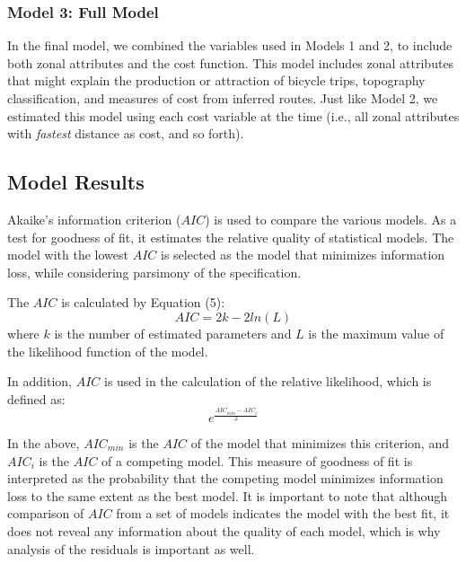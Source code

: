 \documentclass[smallextended]{svjour3}       %
\begin{document}
\hypertarget{model-3-full-model}{%
\subsubsection{Model 3: Full Model}\label{model-3-full-model}}

In the final model, we combined the variables used in Models 1 and 2, to
include both zonal attributes and the cost function. This model includes
zonal attributes that might explain the production or attraction of
bicycle trips, topography classification, and measures of cost from
inferred routes. Just like Model 2, we estimated this model using each
cost variable at the time (i.e., all zonal attributes with
\emph{fastest} distance as cost, and so forth).

\hypertarget{model-results}{%
\subsection{Model Results}\label{model-results}}

Akaike's information criterion (\(AIC\)) is used to compare the various
models. As a test for goodness of fit, it estimates the relative quality
of statistical models. The model with the lowest \(AIC\) is selected as
the model that minimizes information loss, while considering parsimony
of the specification.

The \(AIC\) is calculated by Equation (5): \[
AIC = 2k - 2ln(L)
\] \noindent where \(k\) is the number of estimated parameters and \(L\)
is the maximum value of the likelihood function of the model.

In addition, \(AIC\) is used in the calculation of the relative
likelihood, which is defined as: \[
e^{\frac{AIC_{min} - AIC_i}{2}}
\]

In the above, \(AIC_{min}\) is the \(AIC\) of the model that minimizes
this criterion, and \(AIC_i\) is the \(AIC\) of a competing model. This
measure of goodness of fit is interpreted as the probability that the
competing model minimizes information loss to the same extent as the
best model. It is important to note that although comparison of \(AIC\)
from a set of models indicates the model with the best fit, it does not
reveal any information about the quality of each model, which is why
analysis of the residuals is important as well.
\end{document}

